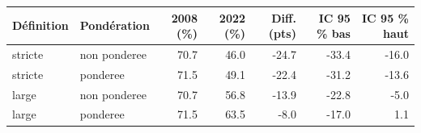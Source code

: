 \begin{tabular}{llrrrrr}
\toprule
D\'efinition & Pond\'eration & 2008 (\%) & 2022 (\%) & Diff. (pts) & IC 95 \% bas & IC 95 \% haut \\
\midrule
stricte & non ponderee & 70.7 & 46.0 & -24.7 & -33.4 & -16.0 \\
stricte & ponderee & 71.5 & 49.1 & -22.4 & -31.2 & -13.6 \\
large & non ponderee & 70.7 & 56.8 & -13.9 & -22.8 & -5.0 \\
large & ponderee & 71.5 & 63.5 & -8.0 & -17.0 & 1.1 \\
\bottomrule
\end{tabular}

